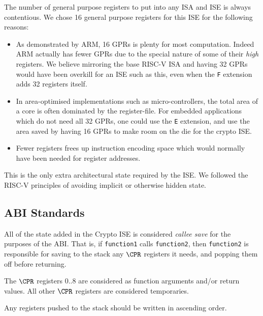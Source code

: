 The number of general purpose registers to put into any ISA and ISE is
always contentious.
We chose 16 general purpose registers for this ISE for the following reasons:

\begin{itemize}
\item As demonstrated by ARM, 16 GPRs is plenty for most computation.
Indeed ARM actually has fewer GPRs due to the special nature of some of their
{\em high} registers.
We believe mirroring the base RISC-V ISA and having
32 GPRs would have been overkill for an ISE such as this, even when the
{\tt F} extension adds 32 registers itself.
\item In area-optimised implementations such as micro-controllers, the
total area of a core is often dominated by the register-file.
For embedded applications which do not need all 32 GPRs, one could use the 
{\tt E} extension, and use the area saved by having 16 GPRs to make room
on the die for the crypto ISE.
\item Fewer registers frees up instruction encoding space which would
normally have been needed for register addresses.
\end{itemize}

This is the only extra architectural state required by the ISE.
We followed the RISC-V principles of avoiding implicit or otherwise
hidden state.

\subsection{ABI Standards}

All of the state added in the Crypto ISE is considered {\em callee save}
for the purposes of the ABI.
That is, if {\tt function1} calls 
{\tt function2}, then {\tt function2} is responsible for saving to the
stack any $\CPR$ registers it needs, and popping them off before returning.

The $\CPR$ registers $0..8$ are considered as function arguments
and/or return values. 
All other $\CPR$ registers are considered temporaries.

Any registers pushed to the stack should be written in ascending order.

